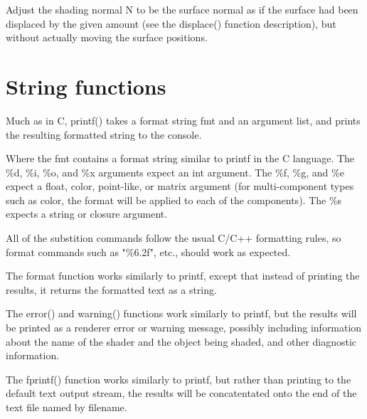 \documentclass[11pt,letterpaper]{book}
\def\color{{\cf color}\xspace}
\def\float{{\cf float}\xspace}
\def\matrix{{\cf matrix}\xspace}
\def\N{{\cf N}\xspace}
\begin{document}

Adjust the shading normal \N to be the surface normal as if the
surface had been displaced by the given amount (see the {\cf displace()}
function description), but without actually moving the surface
positions.
\apiend


\section{String functions}
\label{sec:stdlib:string}


Much as in C, {\cf printf()} takes a format string {\cf fmt} and an
argument list, and prints the resulting formatted string to the console.

Where the {\cf fmt} contains a format string similar to {\cf printf} in
the C language. The {\cf \%d}, {\cf \%i}, {\cf \%o}, and {\cf \%x}
arguments expect an {\cf int} argument.  The {\cf \%f}, {\cf \%g}, and
{\cf \%e} expect a \float, \color, point-like, or \matrix argument (for
multi-component types such as \color, the format will be applied to each
of the components).  The {\cf \%s} expects a {\cf string} or 
{\cf closure} argument.

All of the substition commands follow the usual C/C++ formatting rules,
so format commands such as {\cf "\%6.2f"}, etc., should work as
expected.
\apiend

The {\cf format} function works similarly to {\cf printf}, except that
instead of printing the results, it returns the formatted text as a
{\cf string}.
\apiend

 
The {\cf error()} and {\cf warning()} functions work similarly to {\cf printf}, but the
results will be printed as a renderer error or warning message, possibly including
information about the name of the shader and the object being shaded,
and other diagnostic information.
\apiend

The {\cf fprintf()} function works similarly to {\cf printf}, but rather
than printing to the default text output stream, the results will be
concatentated onto the end of the text file named by {\cf filename}.
\apiend
\end{document}
